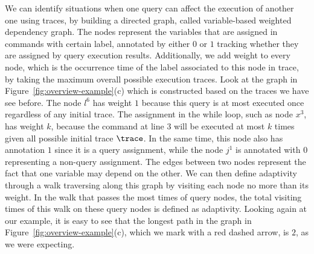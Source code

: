  We can identify situations when one query can affect the execution of another one using traces, by building a directed graph,
called variable-based weighted dependency graph. The nodes represent the variables that are assigned in commands with certain label, annotated by either $0$ or $1$ tracking whether they are assigned by query execution results. Additionally, we add weight to every node, which is the occurrence time of the label associated to this node in trace, by taking the maximum overall possible execution traces. 
Look at the graph in Figure~\ref{fig:overview-example}(c) which is constructed based on the traces we have see before.
The node $l^{6}$ has weight $1$ because this query is at most executed once regardless of any initial trace. 
The assignment in the while loop, such as node $x^{3}$, 
has weight $k$, because the command at line $3$ will be executed 
at most $k$ times given all possible initial trace $\trace$.
In the same time, this node also has annotation $1$ since it is a query assignment, 
while the node $j^{1}$ is annotated with $0$ representing a non-query assignment. 
The edges between two nodes represent the fact that one variable may depend on the other.
We can then define adaptivity through a walk traversing along this graph by visiting each node no more than its weight.
In the walk that passes the most times of query nodes, the total visiting times of this walk on 
these query nodes is defined as adaptivity.
%
Looking again at our example, it is easy to see that the longest path in the graph in Figure~\ref{fig:overview-example}(c), which we mark with a red dashed arrow, is $2$, as we were expecting.

